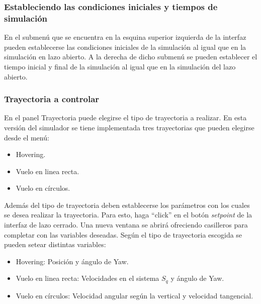 \documentclass[main]{subfiles}
\begin{document}
\subsubsection*{Estableciendo las condiciones iniciales y tiempos de simulaci\'on}
En el submen\'u que se encuentra en la esquina superior izquierda de la interfaz pueden establecerse las condiciones iniciales de la simulaci\'on al igual que en la simulaci\'on en lazo abierto. A la derecha de dicho submen\'u se pueden establecer el tiempo inicial y final de la simulaci\'on al igual que en la simulaci\'on del lazo abierto.

\subsubsection*{Trayectoria a controlar}
En el panel Trayectoria puede elegirse el tipo de trayectoria a realizar. En esta versi\'on del simulador se tiene implementada tres trayectorias que pueden elegirse desde el men\'u:
\begin{itemize}
\item Hovering.
\item Vuelo en linea recta.
\item Vuelo en c\'irculos.
\end{itemize}

Adem\'as del tipo de trayectoria deben establecerse los par\'ametros con los cuales se desea realizar la trayectoria. Para esto, haga ``click'' en el bot\'on \emph{setpoint} de la interfaz de lazo cerrado. Una nueva ventana se abrir\'a ofreciendo casilleros para completar con las variables deseadas. Seg\'un el tipo de trayectoria escogida se pueden setear distintas variables:
\begin{itemize}
\item Hovering: Posici\'on y \'angulo de Yaw.
\item Vuelo en linea recta: Velocidades en el sistema $S_q$ y \'angulo de Yaw.
\item Vuelo en c\'irculos: Velocidad angular seg\'un la vertical y velocidad tangencial.
\end{itemize}
\end{document}
